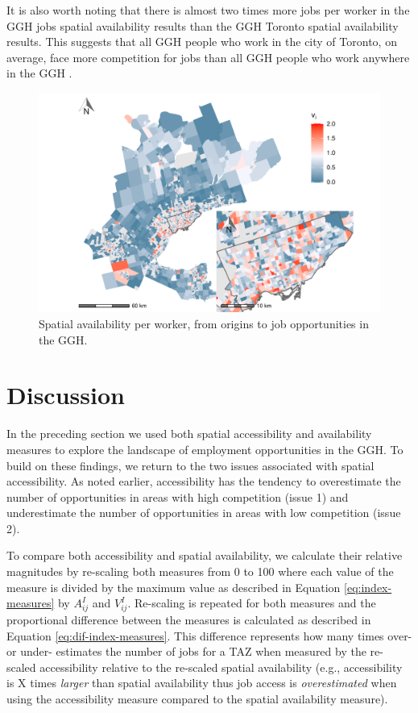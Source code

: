 \documentclass[]{elsarticle} %
\begin{document}
It is also worth noting that there is almost two times more jobs per
worker in the GGH jobs spatial availability results than the GGH Toronto
spatial availability results. This suggests that all GGH people who work
in the city of Toronto, on average, face more competition for jobs than
all GGH people who work anywhere in the GGH .

\begin{figure}
\includegraphics[width=1\linewidth]{Spatial-Availability_files/figure-latex/plot-avail-GGH-TTS-per-worker-1} \caption{\label{fig:plot-avail-GGH-TTS-per-worker}Spatial availability per worker, from origins to job opportunities in the GGH.}\label{fig:plot-avail-GGH-TTS-per-worker}
\end{figure}

\newpage

\hypertarget{discussion}{%
\section{Discussion}\label{discussion}}

In the preceding section we used both spatial accessibility and
availability measures to explore the landscape of employment
opportunities in the GGH. To build on these findings, we return to the
two issues associated with spatial accessibility. As noted earlier,
accessibility has the tendency to overestimate the number of
opportunities in areas with high competition (issue 1) and underestimate
the number of opportunities in areas with low competition (issue 2).

To compare both accessibility and spatial availability, we calculate
their relative magnitudes by re-scaling both measures from 0 to 100
where each value of the measure is divided by the maximum value as
described in Equation \ref{eq:index-measures} by \(A^I_{ij}\) and
\(V^I_{ij}\). Re-scaling is repeated for both measures and the
proportional difference between the measures is calculated as described
in Equation \ref{eq:dif-index-measures}. This difference represents how
many times over- or under- estimates the number of jobs for a TAZ when
measured by the re-scaled accessibility relative to the re-scaled
spatial availability (e.g., accessibility is X times \emph{larger} than
spatial availability thus job access is \emph{overestimated} when using
the accessibility measure compared to the spatial availability measure).
\end{document}
